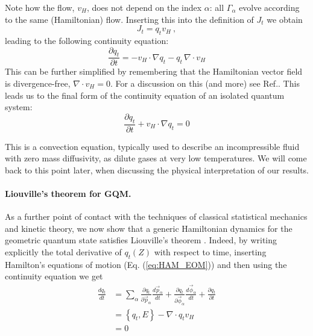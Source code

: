 \documentclass[%
 reprint,
 superscriptaddress,
 aps,
 pra,
]{revtex4-2}
\theoremstyle{definition}
\begin{document}
Note how the flow, $v_H$, does not depend on the index $\alpha$: all 
$\Gamma_\alpha$ evolve according to the same (Hamiltonian) flow. Inserting this into the definition of $J_t$ 
we obtain
\begin{equation}
J_t = q_t v_H~,
\end{equation}
leading to the following continuity equation:
\begin{equation}
\frac{\partial q_t}{\partial t} = - v_H \cdot \nabla q_t - q_t \, \nabla \cdot v_H
\end{equation}
This can be further simplified by remembering that the Hamiltonian vector field is divergence-free, $\nabla \cdot v_H = 0$.
For a discussion on this (and more) see Ref.\cite{Marsden1999IntroductionMechanicsSymmetry}. This leads us to the final form of the continuity equation of an isolated 
quantum system:
\begin{equation}
\frac{\partial q_t}{\partial t} + v_H \cdot \nabla q_t =0
\end{equation}

This is a convection equation, typically used to describe an incompressible fluid with zero mass diffusivity, 
as dilute gases at very low temperatures. We will come back to this point later, when discussing the physical 
interpretation of our results.




\paragraph*{Liouville's theorem for GQM.} As a further point of contact with the techniques of classical 
statistical mechanics and kinetic theory, we now show that a generic Hamiltonian dynamics for the 
geometric quantum state satisfies Liouville's theorem \cite{Soto2017KineticTheoryTransport}. Indeed, by writing explicitly the total 
derivative of $q_t(Z)$ with respect to time, inserting Hamilton's equations of motion (Eq. (\ref{eq:HAM_EOM})) and then using the continuity equation we get
\begin{align}
\frac{d q_t}{d t} &= \sum_\alpha \frac{\partial q_t}{\partial \vec{p}_\alpha} \frac{d\vec{p}_\alpha}{dt}+\frac{\partial q_t}{\partial \vec{\phi}_\alpha} \frac{d\vec{\phi}_\alpha}{dt} + \frac{\partial q_t}{\partial t} \nonumber\\
& = \left\{ q_t, E\right\} - \nabla \cdot q_t v_H \nonumber \\
& = 0
\end{align}
\end{document}
